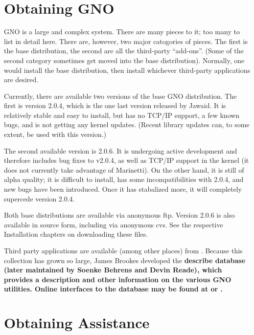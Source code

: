 \documentclass{report}
\begin{document}
\section{Obtaining GNO}

GNO is a large and complex system.  There are many pieces to it;
too many to list in detail here.  There are, however, two major
catogories of pieces.  The first is the base distribution, the
second are all the third-party ``add-ons''.  
(Some of the second category sometimes get moved into the base distribution).
Normally, one would install the base distribution, then install 
whichever third-party applications are desired.

Currently, there are available two versions of the base GNO distribution.
The first is version 2.0.4, which is the one last version released by Jawaid.
It is relatively stable and easy to install,
but has no TCP/IP support, a few known bugs, and is not getting
any kernel updates.  (Recent library updates can, to some extent, be used
with this version.)

The second available version is 2.0.6.  It is undergoing active development
and therefore includes bug fixes to v2.0.4, as well as TCP/IP support
in the kernel (it does not currently take advantage of Marinetti).
On the other hand, it is still of alpha quality;  it is difficult to 
install, has some incompatibilities with 2.0.4, and new bugs have been
introduced.  Once it has stabalized more, it will completely supercede
version 2.0.4.

Both base distributions are available via anonymous ftp.
Version 2.0.6 is also available in source form, including via anonymous cvs.
See the respective Installation chapters on downloading these files.

Third party applications are available (among other places) from 
.  Because this
collection has grown so large, James Brookes developed the \bf describe\rm
database (later maintained by Soenke Behrens and Devin Reade), which
provides a description and other information on the various GNO utilities.
Online interfaces to the database may be found at
or
.

\section{Obtaining Assistance}
\end{document}
